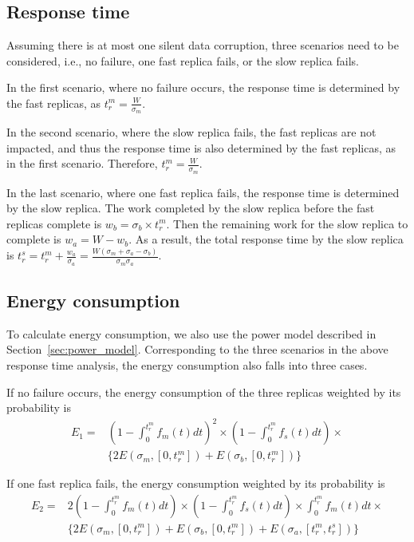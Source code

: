 \subsection{Response time}
Assuming there is at most one silent data corruption, three scenarios need to be considered, i.e., no failure, one fast replica fails, or the slow replica  fails.

In the first scenario, where no failure occurs, the response time is determined by the fast replicas, as $t_r^m=\frac{W}{\sigma_m}$.

In the second scenario, 
where the slow replica fails, the fast replicas are not impacted, and thus the response time is also determined by the fast replicas, as in the first scenario. Therefore, $t_r^m=\frac{W}{\sigma_m}$.


In the last scenario, where one fast replica fails, the response time is determined by the slow replica. The work completed by the slow replica before the fast replicas complete is $w_b = \sigma_b \times t_r^m$. Then the remaining work for the slow replica to complete is $w_a = W - w_b$. As a result, the total response time by the slow replica is $t_r^s = t_r^m + \frac{w_a}{\sigma_a} = \frac{W(\sigma_m + \sigma_a - \sigma_b)}{\sigma_m \sigma_a}$.



\subsection{Energy consumption}
To calculate energy consumption, we also use the power model described in Section~\ref{sec:power_model}.
Corresponding to the three scenarios in the above response time analysis, the energy consumption also falls into three cases. 

If no failure occurs, the energy consumption of the three replicas weighted by its probability is
\begin{equation}
\begin{split}
E_1 = & (1 - \int_{0}^{t_r^m} f_m(t)dt)^2 \times (1 - \int_{0}^{t_r^m} f_s(t)dt) \times \\
      & \{2E(\sigma_m, [0, t_r^m])+E(\sigma_b, [0, t_r^m])\}
\end{split}
\end{equation}

If one fast replica fails, the energy consumption weighted by its probability is 
\begin{equation}
\begin{split}
E_2 = & 2(1 - \int_{0}^{t_r^m} f_m(t)dt) \times 
(1 - \int_{0}^{t_r^m} f_s(t)dt) \times \int_{0}^{t_r^m} f_m(t)dt \times \\       & \{2E(\sigma_m, [0, t_r^m]) + E(\sigma_b, [0, t_r^m]) + E(\sigma_a, [t_r^m, t_r^s])  \}
\end{split}
\end{equation}

